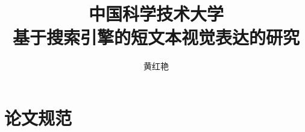 \documentclass[bachelor,fontset=windowsold]{ustcthesis}
\title{中国科学技术大学\\基于搜索引擎的短文本视觉表达的研究}
\author{黄红艳}
\begin{document}
\maketitle

%
%
%

\frontmatter

\tableofcontents


\listoffigures
\listoftables
\listofalgorithms  %
% 

\mainmatter






%

%
%
%
%
%
%
%

\appendix
\chapter{论文规范}

\backmatter


\end{document}
